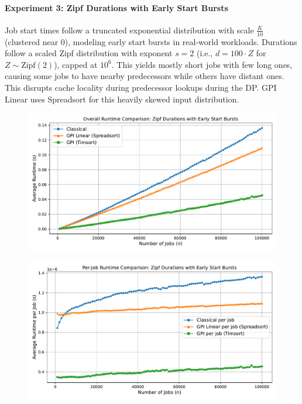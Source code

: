 \documentclass[final,5p,times]{elsarticle}
\begin{document}
\paragraph{Experiment 3: Zipf Durations with Early Start Bursts}
Job start times follow a truncated exponential distribution with scale $\frac{K}{10}$ (clustered near 0), modeling early start bursts in real-world workloads. Durations follow a scaled Zipf distribution with exponent $s = 2$ (i.e., $d = 100 \cdot Z$ for $Z \sim \text{Zipf}(2)$), capped at $10^6$. This yields mostly short jobs with few long ones, causing some jobs to have nearby predecessors while others have distant ones. This disrupts cache locality during predecessor lookups during the DP. GPI Linear uses Spreadsort for this heavily skewed input distribution.
\vspace{-1em}
\begin{figure}[H]
    \centering
    \includegraphics[width=1\linewidth]{figures/Zipf_Durations_with_Early_Start_Bursts_runtime_total.pdf}
    \label{fig:exp3-runtime-total}
\end{figure}
\vspace{-2.5em}
\begin{figure}[H]
    \includegraphics[width=1\linewidth]{figures/Zipf_Durations_with_Early_Start_Bursts_runtime_per_job.pdf}
    \label{fig:exp3-runtime-per-job}
\end{figure}
\vspace{-2em}
\end{document}
